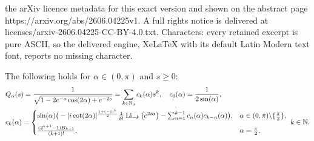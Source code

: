 \documentclass[10pt,a4paper]{amsart}
\DeclareMathOperator{\Li}{Li}
\begin{document}
the arXiv licence metadata for this exact version and shown on the abstract page https://arxiv.org/abs/2606.04225v1. A full rights notice is delivered at licenses/arxiv-2606.04225-CC-BY-4.0.txt. Characters: every retained excerpt is pure ASCII, so the delivered engine, XeLaTeX with its default Latin Modern text font, reports no missing character.
\begin{lem}\label{Lem:Sqrt}
The following holds for $\alpha\in(0,\pi)$ and $s\geq0$: 
\begin{align}\label{Eq:Sqrtseries}
&Q_\alpha(s)=\frac{1}{\sqrt{1-2e^{-s}\cos(2\alpha)+e^{-2s}}}=\sum_{k\in\mathbb{N}_0}c_k(\alpha)s^k,\quad c_0(\alpha)=\frac{1}{2\sin(\alpha)},\\
&c_k(\alpha)=\begin{cases}
\sin(\alpha)\big(-[i\cot(2\alpha)]^{\frac{1+(-1)^k}{2}}\frac{1}{k!}\Li_{-k}\big(e^{2i\alpha}\big)-\sum_{n=1}^{k-1}c_n(\alpha) c_{k-n}(\alpha)\big),& \alpha\in(0,\pi)\backslash\{\tfrac{\pi}{2}\},\\[2mm]
\frac{(2^{k+1}-1)B_{k+1}}{(k+1)!},& \alpha=\tfrac{\pi}{2},
\end{cases}\ k\in\mathbb{N}.\notag
\end{align}
\end{lem}
\end{document}
